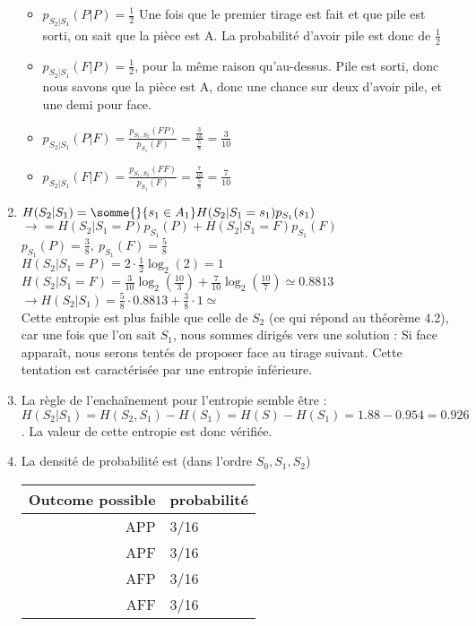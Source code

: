\documentclass[10pt,a4paper]{article}
\begin{document}
\begin{enumerate}
		\begin{itemize}
			\item $p_{S_2|S_1}(P|P) = \frac{1}{2}$ Une fois que le premier tirage est fait et que pile est sorti, on sait que la pièce est A. La probabilité d'avoir pile est donc de $\frac{1}{2}$
			\item $p_{S_2|S_1}(F|P) = \frac{1}{2}$, pour la même raison qu'au-dessus. Pile est sorti, donc nous savons que la pièce est A, donc une chance sur deux d'avoir pile, et une demi pour face.
			\item $p_{S_2|S_1}(P|F) = \frac{p_{S_1,S_2}(FP)}{p_{S_1}(F)} = \frac{\frac{3}{16}}{\frac{5}{8}} = \frac{3}{10}$
			\item $p_{S_2|S_1}(F|F) = \frac{p_{S_1,S_2}(FF)}{p_{S_1}(F)} = \frac{\frac{7}{10}}{\frac{5}{8}} = \frac{7}{10}$
		\end{itemize}
	\item $H(S_2|S_1) = \somme{}{s_1\in A_1} H(S_2|S_1=s_1)p_{S_1}(s_1)$\\
	$\to = H(S_2|S_1 =P)p_{S_1}(P) + H(S_2|S_1 = F)p_{S_1}(F)$\\
	$p_{S_1}(P) = \frac{3}{8},\ p_{S_1}(F) =\frac{5}{8}$ \\
	$H(S_2|S_1=P) = 2\cdot\frac{1}{2}\log_2(2) = 1$\\
	$H(S_2|S_1=F) = \frac{3}{10}\log_2(\frac{10}{3}) + \frac{7}{10}\log_2(\frac{10}{7}) \simeq 0.8813$\\
	$\to H(S_2|S_1) = \frac{5}{8}\cdot 0.8813 + \frac{3}{8}\cdot 1 \simeq$ \\
	Cette entropie est plus faible que celle de $S_2$ (ce qui répond au théorème 4.2), car une fois que l'on sait $S_1$, nous sommes dirigés vers une solution : Si face apparaît, nous serons tentés de proposer face au tirage suivant. Cette tentation est caractérisée par une entropie inférieure.
	\item La règle de l'enchaînement pour l'entropie semble être :\\
	$H(S_2|S_1) = H(S_2,S_1)-H(S_1) = H(S)-H(S_1) = 1.88-0.954 = 0.926$. La valeur de cette entropie est donc vérifiée.
	\item La densité de probabilité est (dans l'ordre $S_0, S_1, S_2$)
		\begin{tabular}{r|l}
			Outcome possible & probabilité\\
				\hline
			APP & 3/16\\
			APF & 3/16\\
			AFP & 3/16\\
			AFF & 3/16\\

\end{tabular}
\end{enumerate}
\end{document}
